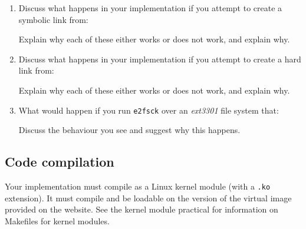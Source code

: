 \documentclass[12pt,a4paper]{article}
\begin{document}
\begin{enumerate}
    \item Discuss what happens in your implementation if you attempt to create a symbolic link from:
    Explain why each of these either works or does not work, and explain why.

    \item Discuss what happens in your implementation if you attempt to create a hard link from:
    Explain why each of these either works or does not work, and explain why.

    \item What would happen if you run \texttt{e2fsck} over an \textit{ext3301} file system that:
    Discuss the behaviour you see and suggest why this happens.
\end{enumerate}

\subsection*{Code compilation}

Your implementation must compile as a Linux kernel module (with a \texttt{.ko}
extension). It must compile and be loadable on the version of the virtual image
provided on the website. See the kernel module practical for information on
Makefiles for kernel modules.
\end{document}
